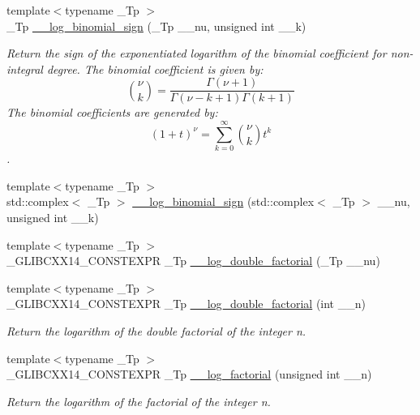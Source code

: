 \begin{DoxyCompactItemize}
{\footnotesize template$<$typename \+\_\+\+Tp $>$ }\\\+\_\+\+Tp \hyperlink{namespacestd_1_1____detail_aa89a8a5ced6325e1d64782f84e4ad95d}{\+\_\+\+\_\+log\+\_\+binomial\+\_\+sign} (\+\_\+\+Tp \+\_\+\+\_\+nu, unsigned int \+\_\+\+\_\+k)
\begin{DoxyCompactList}\small\item\em Return the sign of the exponentiated logarithm of the binomial coefficient for non-\/integral degree. The binomial coefficient is given by\+: \[ \binom{\nu}{k} = \frac{\Gamma(\nu+1)}{\Gamma(\nu-k+1) \Gamma(k+1)} \] The binomial coefficients are generated by\+: \[ \left(1 + t\right)^\nu = \sum_{k=0}^\infty \binom{\nu}{k} t^k \]. \end{DoxyCompactList}\item 
{\footnotesize template$<$typename \+\_\+\+Tp $>$ }\\std\+::complex$<$ \+\_\+\+Tp $>$ \hyperlink{namespacestd_1_1____detail_ad73e7e0dfab6a4f54af026fa3d9e9c9a}{\+\_\+\+\_\+log\+\_\+binomial\+\_\+sign} (std\+::complex$<$ \+\_\+\+Tp $>$ \+\_\+\+\_\+nu, unsigned int \+\_\+\+\_\+k)
\item 
{\footnotesize template$<$typename \+\_\+\+Tp $>$ }\\\+\_\+\+G\+L\+I\+B\+C\+X\+X14\+\_\+\+C\+O\+N\+S\+T\+E\+X\+PR \+\_\+\+Tp \hyperlink{namespacestd_1_1____detail_ad7606a8224ac0c2256996b91051a48a5}{\+\_\+\+\_\+log\+\_\+double\+\_\+factorial} (\+\_\+\+Tp \+\_\+\+\_\+nu)
\item 
{\footnotesize template$<$typename \+\_\+\+Tp $>$ }\\\+\_\+\+G\+L\+I\+B\+C\+X\+X14\+\_\+\+C\+O\+N\+S\+T\+E\+X\+PR \+\_\+\+Tp \hyperlink{namespacestd_1_1____detail_aa832ed1d29fd41c40cf892cc1feef7e9}{\+\_\+\+\_\+log\+\_\+double\+\_\+factorial} (int \+\_\+\+\_\+n)
\begin{DoxyCompactList}\small\item\em Return the logarithm of the double factorial of the integer n. \end{DoxyCompactList}\item 
{\footnotesize template$<$typename \+\_\+\+Tp $>$ }\\\+\_\+\+G\+L\+I\+B\+C\+X\+X14\+\_\+\+C\+O\+N\+S\+T\+E\+X\+PR \+\_\+\+Tp \hyperlink{namespacestd_1_1____detail_a2809419dbbe9fc60066dacfdc13761d4}{\+\_\+\+\_\+log\+\_\+factorial} (unsigned int \+\_\+\+\_\+n)
\begin{DoxyCompactList}\small\item\em Return the logarithm of the factorial of the integer n. \end{DoxyCompactList}\item 

\end{DoxyCompactItemize}
